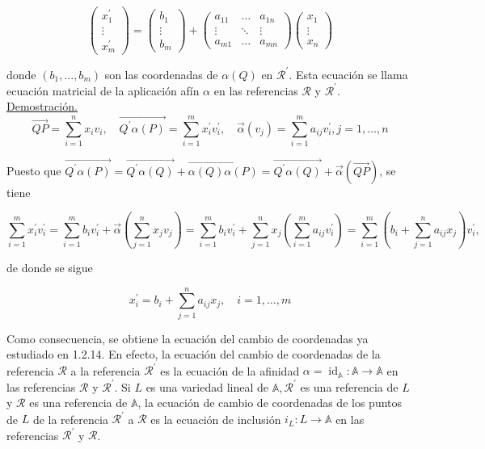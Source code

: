 \documentclass[12pt, a4paper, ones, notitlepage, openany,titlepage]{article}
\begin{document}
$$
\left(\begin{array}{c}
x_{1}^{\prime} \\
\vdots \\
x_{m}^{\prime}
\end{array}\right)=\left(\begin{array}{c}
b_{1} \\
\vdots \\
b_{m}
\end{array}\right)+\left(\begin{array}{ccc}
a_{11} & \ldots & a_{1 n} \\
\vdots & \ddots & \vdots \\
a_{m 1} & \ldots & a_{m n}
\end{array}\right)\left(\begin{array}{c}
x_{1} \\
\vdots \\
x_{n}
\end{array}\right)
$$

donde $\left(b_{1}, \ldots, b_{m}\right)$ son las coordenadas de $\alpha(Q)$ en $\mathcal{R}^{\prime}$. Esta ecuación se llama ecuación matricial de la aplicación afín $\alpha$ en las referencias $\mathcal{R}$ y $\mathcal{R}^{\prime}$.\\

\underline{Demostración.}
$$
\overrightarrow{Q P}=\sum_{i=1}^{n} x_{i} v_{i}, \quad \overrightarrow{Q^{\prime} \alpha(P)}=\sum_{i=1}^{m} x_{i}^{\prime} v_{i}^{\prime}, \quad \vec{\alpha}\left(v_{j}\right)=\sum_{i=1}^{m} a_{i j} v_{i}^{\prime}, j=1, \ldots, n
$$

Puesto que $\overrightarrow{Q^{\prime} \alpha(P)}=\overrightarrow{Q^{\prime} \alpha(Q)}+\overrightarrow{\alpha(Q) \alpha(P)}=\overrightarrow{Q^{\prime} \alpha(Q)}+\vec{\alpha}(\overrightarrow{Q P})$, se tiene

$$
\sum_{i=1}^{m} x_{i}^{\prime} v_{i}^{\prime}=\sum_{i=1}^{m} b_{i} v_{i}^{\prime}+\vec{\alpha}\left(\sum_{j=1}^{n} x_{j} v_{j}\right)=\sum_{i=1}^{m} b_{i} v_{i}^{\prime}+\sum_{j=1}^{n} x_{j}\left(\sum_{i=1}^{m} a_{i j} v_{i}^{\prime}\right)=\sum_{i=1}^{m}\left(b_{i}+\sum_{j=1}^{n} a_{i j} x_{j}\right) v_{i}^{\prime},
$$

de donde se sigue

$$
x_{i}^{\prime}=b_{i}+\sum_{j=1}^{n} a_{i j} x_{j}, \quad i=1, \ldots, m
$$

Como consecuencia, se obtiene la ecuación del cambio de coordenadas ya estudiado en 1.2.14. En efecto, la ecuación del cambio de coordenadas de la referencia $\mathcal{R}$ a la referencia $\mathcal{R}^{\prime}$ es la ecuación de la afinidad $\alpha=\operatorname{id}_{\mathbb{A}}: \mathbb{A} \rightarrow \mathbb{A}$ en las referencias $\mathcal{R}$ y $\mathcal{R}^{\prime}$. Si $L$ es una variedad lineal de $\mathbb{A}, \mathcal{R}^{\prime}$ es una referencia de $L$ y $\mathcal{R}$ es una referencia de $\mathbb{A}$, la ecuación de cambio de coordenadas de los puntos de $L$ de la referencia $\mathcal{R}^{\prime}$ a $\mathcal{R}$ es la ecuación de inclusión $i_{L}: L \rightarrow \mathbb{A}$ en las referencias $\mathcal{R}^{\prime}$ y $\mathcal{R}$.
\end{document}
